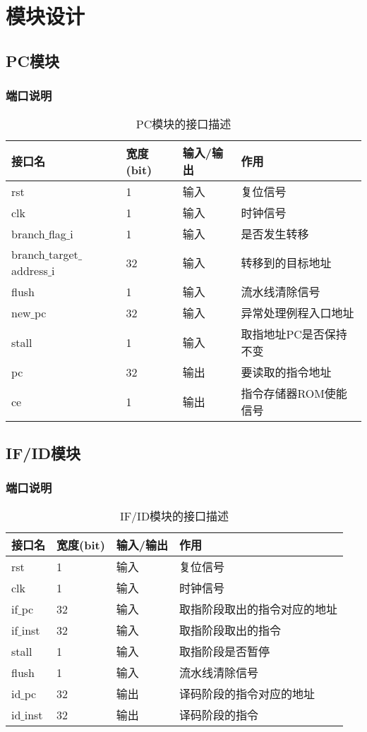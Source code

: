 \section{模块设计}
\subsection{PC模块}
\subsubsection{端口说明}
\begin{table}[H]
	\centering
	\caption{PC模块的接口描述}
	\begin{tabular}{|l|l|l|l|}
		\hline
		接口名 & 宽度(bit) & 输入/输出 & 作用 \\
		\hline
		rst & 1 & 输入 & 复位信号 \\
		\hline
		clk & 1 & 输入 & 时钟信号 \\
		\hline
		branch$\_$flag$\_$i & 1 & 输入 & 是否发生转移 \\
		\hline
		branch$\_$target$\_$address$\_$i & 32 & 输入 & 转移到的目标地址 \\
		\hline
		flush & 1 & 输入 & 流水线清除信号 \\
		\hline
		new$\_$pc & 32 & 输入 & 异常处理例程入口地址 \\
		\hline
		stall & 1 & 输入 & 取指地址PC是否保持不变 \\
		\hline
		pc & 32 & 输出 & 要读取的指令地址 \\
		\hline
		ce & 1 & 输出 & 指令存储器ROM使能信号 \\
		\hline
	\end{tabular}
\end{table}
\subsection{IF/ID模块}
\subsubsection{端口说明}
\begin{table}[H]
	\centering
	\caption{IF/ID模块的接口描述}
	\begin{tabular}{|l|l|l|l|}
		\hline
		接口名 & 宽度(bit) & 输入/输出 & 作用 \\
		\hline
		rst & 1 & 输入 & 复位信号 \\
		\hline
		clk & 1 & 输入 & 时钟信号 \\
		\hline
		if$\_$pc & 32 & 输入 & 取指阶段取出的指令对应的地址 \\
		\hline
		if$\_$inst & 32 & 输入 & 取指阶段取出的指令 \\
		\hline
		stall & 1 & 输入 & 取指阶段是否暂停 \\
		\hline
		flush & 1 & 输入 & 流水线清除信号 \\
		\hline
		id$\_$pc & 32 & 输出 & 译码阶段的指令对应的地址 \\
		\hline
		id$\_$inst & 32 & 输出 & 译码阶段的指令 \\
		\hline
	\end{tabular}
\end{table}
